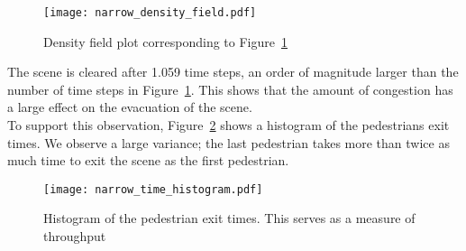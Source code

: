 \documentclass{article}
\begin{document}
\begin{figure}[h]
    \centering
    \texttt{[image: narrow\_density\_field.pdf]}
	\caption{Density field plot corresponding to Figure~\ref{fig:narrow_scene2}}
    \label{fig:narrow_scene2}
\end{figure}
The scene is cleared after 1.059 time steps, an order of magnitude larger than the number of time steps in Figure~\ref{fig:narrow_scene2}. This shows that the amount of congestion has a large effect on the evacuation of the scene. \\
To support this observation, Figure~\ref{fig:narrow_time_histogram} shows a histogram of the pedestrians exit times. We observe a large variance; the last pedestrian takes more than twice as much time to exit the scene as the first pedestrian.
\begin{figure}[h]
    \centering
    \texttt{[image: narrow\_time\_histogram.pdf]}
    \caption{Histogram of the pedestrian exit times. This serves as a measure of throughput}
    \label{fig:narrow_time_histogram}
\end{figure}
\end{document}
